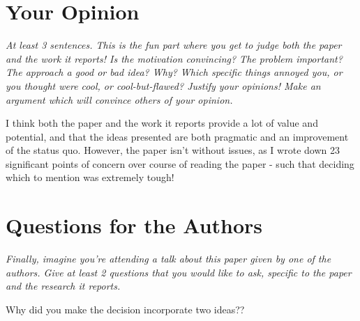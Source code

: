 \documentclass[11pt]{article}
\begin{document}



\section*{Your Opinion}

\textsl{At least 3 sentences. This is the fun part where you get to judge both
the paper and the work it reports! Is the motivation convincing? The problem
important? The approach a good or bad idea? Why? Which specific things annoyed
you, or you thought were cool, or cool-but-flawed? Justify your opinions! Make
an argument which will convince others of your opinion.}

I think both the paper and the work it reports provide a lot of value and
potential, and that the ideas presented are both pragmatic and an improvement
of the status quo. However, the paper isn't without issues, as I wrote down 23
significant points of concern over course of reading the paper - such that
deciding which to mention was extremely tough!

\section*{Questions for the Authors}

\textsl{Finally, imagine you're attending a talk about this paper given by one
of the authors. Give at least 2 questions that you would like to ask, specific
to the paper and the research it reports.}

Why did you make the decision incorporate two ideas??




\end{document}
